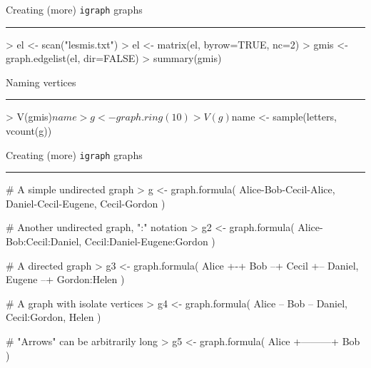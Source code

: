 \documentclass[landscape,fleqno]{foils}
\newcommand{\stitle}[1]{{\color{blue}\Large #1\par\vspace*{10pt}\hrule}}
\newcommand{\igraph}{\texttt{{igraph}}\xspace}
\newenvironment{narrow}[2]{%
  \begin{list}{}{%
      \setlength{\topsep}{0pt}%
      \setlength{\leftmargin}{#1}%
      \setlength{\rightmargin}{#2}%
      \setlength{\listparindent}{\parindent}%
      \setlength{\itemindent}{\parindent}%
      \setlength{\parsep}{\parskip}}%
    \item[]}{\end{list}}
\begin{document}
\newpage
\stitle{Creating (more) \igraph graphs}
\begin{narrow}{0cm}{15cm}
\begin{Myverb}
 > el <- scan("lesmis.txt")
 > el <- matrix(el, byrow=TRUE, nc=2)
 > gmis <- graph.edgelist(el, dir=FALSE)
 > summary(gmis)
\end{Myverb}
\end{narrow}

\newpage
\stitle{Naming vertices}
\begin{narrow}{0cm}{15cm}
\begin{Myverb}
 > V(gmis)$name
 > g <- graph.ring(10)
 > V(g)$name <- sample(letters, vcount(g))
\end{Myverb}
\end{narrow}

\newpage
\stitle{Creating (more) \igraph graphs}
\begin{narrow}{0cm}{15cm}
\begin{Myverb}
  # A simple undirected graph
  > g <- graph.formula( Alice-Bob-Cecil-Alice, 
      Daniel-Cecil-Eugene, Cecil-Gordon )
\end{Myverb}
\vspace*{-2cm} \pause
\begin{Myverb}
  # Another undirected graph, ":" notation
  > g2 <- graph.formula( Alice-Bob:Cecil:Daniel, 
      Cecil:Daniel-Eugene:Gordon )
\end{Myverb}
\vspace*{-2cm} \pause
\begin{Myverb}
  # A directed graph
  > g3 <- graph.formula( Alice +-+ Bob --+ Cecil 
      +-- Daniel, Eugene --+ Gordon:Helen )
\end{Myverb}
\vspace*{-2cm} \pause
\begin{Myverb}
  # A graph with isolate vertices
  > g4 <- graph.formula( Alice -- Bob -- Daniel, 
      Cecil:Gordon, Helen )
\end{Myverb}
\vspace*{-2cm} \pause
\begin{Myverb}
  # "Arrows" can be arbitrarily long
  > g5 <- graph.formula( Alice +---------+ Bob )
\end{Myverb}
\end{narrow}
\end{document}
